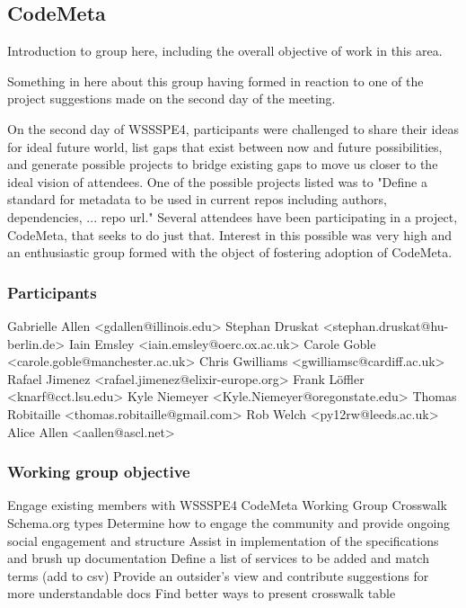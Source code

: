 \subsection{CodeMeta}
\label{sec:CodeMeta}


Introduction to group here, including the overall objective of work in this area.

Something in here about this group having formed in reaction to one of the project suggestions made on the second day of the meeting.

On the second day of WSSSPE4, participants were challenged to share their ideas for ideal future world, list gaps that exist between now and future possibilities, and generate possible projects to bridge existing gaps to move us closer to the ideal vision of attendees. One of the possible projects listed was to "Define a standard for metadata to be used in current repos including authors, dependencies, ... repo url." Several attendees have been participating in a project, CodeMeta, that seeks to do just that. Interest in this possible was very high and an enthusiastic group formed with the object of fostering adoption of CodeMeta.

\subsubsection{Participants}

Gabrielle Allen <gdallen@illinois.edu>
Stephan Druskat <stephan.druskat@hu-berlin.de>
Iain Emsley <iain.emsley@oerc.ox.ac.uk>
Carole Goble <carole.goble@manchester.ac.uk>
Chris Gwilliams <gwilliamsc@cardiff.ac.uk>
Rafael Jimenez <rafael.jimenez@elixir-europe.org>
Frank Löffler <knarf@cct.lsu.edu>
Kyle Niemeyer <Kyle.Niemeyer@oregonstate.edu>
Thomas Robitaille <thomas.robitaille@gmail.com>
Rob Welch <py12rw@leeds.ac.uk>
Alice Allen <aallen@ascl.net>

\subsubsection{Working group objective}

Engage existing members with WSSSPE4 CodeMeta Working Group
Crosswalk Schema.org types 
Determine how to engage the community and provide ongoing social engagement and structure
Assist in implementation of the specifications and brush up documentation 
Define a list of services to be added and match terms (add to csv) 
Provide an outsider’s view and contribute suggestions for more understandable docs 
Find better ways to present crosswalk table 

